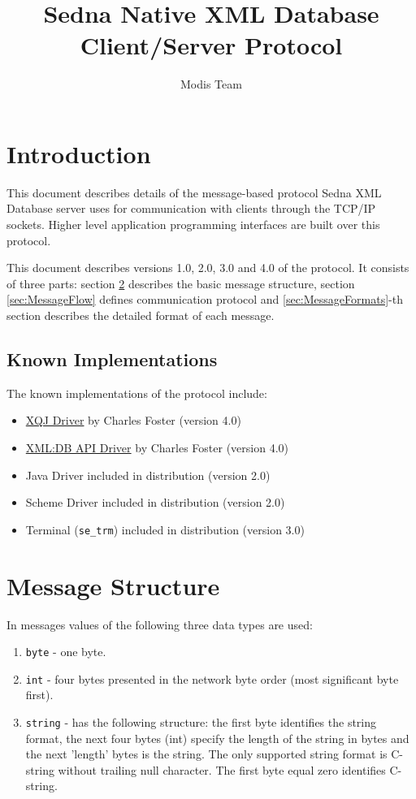 \documentclass[a4paper,12pt]{article}
\title{Sedna Native XML Database Client/Server Protocol}
\date{}
\author{Modis Team}
\newcommand{\TocAt}[6]{}
\begin{document}
\maketitle

\TocAt*{section,subsection,subsubsection}
\TocAt*{subsection,subsubsection}

\tableofcontents
\setlength{\parskip}{1ex plus 0.5ex minus 0.2ex}
\newpage
\section{Introduction}
This document describes details of the message-based protocol Sedna XML Database server uses for communication with clients through the TCP/IP sockets. 
Higher level application programming interfaces are built over this protocol.

This document describes versions 1.0, 2.0, 3.0 and 4.0 of the protocol. It consists of three parts: section \ref{sec:MessageStructure} describes
the basic message structure, section \ref{sec:MessageFlow} defines communication protocol and \ref{sec:MessageFormats}-th section describes the detailed format of each message.

\subsection{Known Implementations}
The known implementations of the protocol include:
\begin{itemize}
\item \href{http://www.cfoster.net/sedna/xqj/}{XQJ Driver} by Charles Foster (version 4.0)
\item \href{http://www.cfoster.net/sedna/}{XML:DB API Driver} by Charles Foster (version 4.0)
\item Java Driver included in distribution (version 2.0)
\item Scheme Driver included in distribution (version 2.0)
\item Terminal (\verb!se_trm!) included in distribution (version 3.0)
\end{itemize}

\newpage

\section{Message Structure}
\label{sec:MessageStructure}
In messages values of the following three data types are used:
\begin{enumerate}
\item \verb!byte! - one byte.
\item \verb!int! - four bytes presented in the network byte order (most significant byte first).
\item \verb!string! - has the following structure: the first byte identifies the string format, the next four bytes (int) specify the length of the string in bytes and the next 'length' bytes is the string. The only supported string format is C-string without trailing null character. The first byte equal zero identifies C-string.
\end{enumerate}
\end{document}
